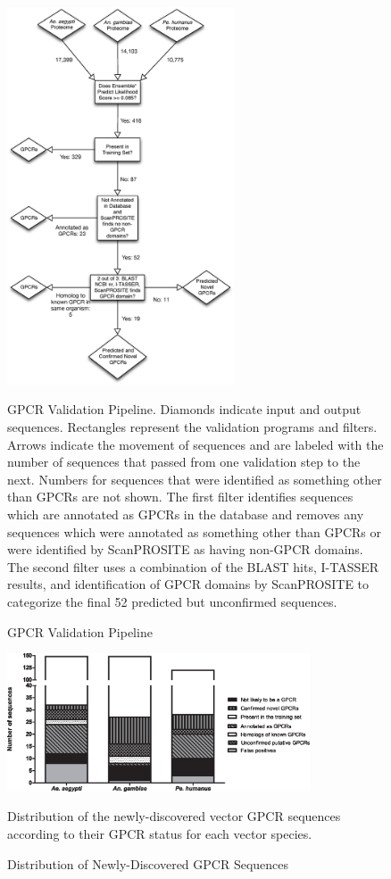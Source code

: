 \begin{figure}[H]
  \centering
  \caption{GPCR Validation Pipeline}
\includegraphics[width=0.6\textwidth]{figures/gpcr_classifier/validation-pipeline.eps}

GPCR Validation Pipeline.  Diamonds indicate input and output sequences.  Rectangles represent the validation programs and filters.  Arrows indicate the movement of sequences and are labeled with the number of sequences that passed from one validation step to the next.  Numbers for sequences that were identified as something other than GPCRs are not shown.  The first filter identifies sequences which are annotated as GPCRs in the database and removes any sequences which were annotated as something other than GPCRs or were identified by ScanPROSITE as having non-GPCR domains.  The second filter uses a combination of the BLAST hits, I-TASSER results, and identification of GPCR domains by ScanPROSITE to categorize the final 52 predicted but unconfirmed sequences.
\label{fig:validation-pipeline}
\end{figure}

\begin{figure}[H]
  \centering
  \caption{Distribution of Newly-Discovered GPCR Sequences}
  \includegraphics[width=0.8\textwidth]{figures/gpcr_classifier/summary-independent-validation.eps}
  
Distribution of the newly-discovered vector GPCR sequences according to their GPCR status for each vector species.
\label{fig:summary-independent-validation}
\end{figure}

